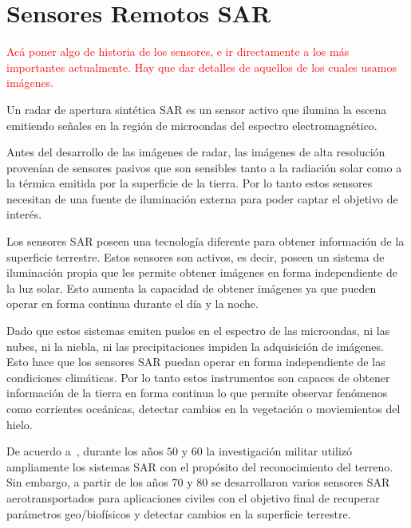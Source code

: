 

\section{Sensores Remotos SAR}

\textcolor{red}{Acá poner algo de historia de los sensores, e ir directamente a los más importantes actualmente. Hay que dar detalles de aquellos de los cuales usamos imágenes.}

Un radar de apertura sintética SAR es un sensor activo que ilumina la escena emitiendo señales en la región de microondas del espectro electromagnético.

Antes del desarrollo de las imágenes de radar, las imágenes de alta resolución provenían de sensores pasivos que son sensibles tanto a la radiación solar como a la térmica emitida por la superficie de la tierra. Por lo tanto estos sensores necesitan de una fuente de iluminación externa para poder captar el objetivo de interés. 

Los sensores SAR poseen una tecnología diferente para obtener información de la superficie terrestre. Estos sensores son activos, es decir, poseen un sistema de iluminación propia que les permite obtener imágenes en forma independiente de la luz solar. Esto aumenta la capacidad de obtener imágenes ya que pueden operar en forma continua durante el día y la noche.

Dado que estos sistemas emiten puslos en el espectro de las microondas, ni las nubes, ni la niebla, ni las precipitaciones impiden la adquisición de imágenes. Esto hace que los sensores SAR puedan operar en forma independiente de las condiciones climáticas. Por lo tanto estos instrumentos son capaces de obtener información de la tierra en forma continua lo que permite observar fenómenos como corrientes oceánicas, detectar cambios en la vegetación o moviemientos del hielo.


De acuerdo a~\cite{Moreira2013}, durante los años $50$ y $60$ la investigación militar utilizó ampliamente los sistemas SAR con el propósito del reconocimiento del terreno. Sin embargo, a partir de los años $70$ y $80$ se desarrollaron varios sensores SAR aerotransportados  para aplicaciones civiles con el objetivo final de recuperar parámetros geo/biofísicos y detectar cambios en la superficie terrestre.

